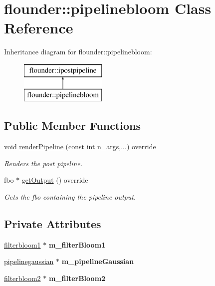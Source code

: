 \hypertarget{classflounder_1_1pipelinebloom}{}\section{flounder\+:\+:pipelinebloom Class Reference}
\label{classflounder_1_1pipelinebloom}
Inheritance diagram for flounder\+:\+:pipelinebloom\+:\begin{figure}[H]
\begin{center}
\leavevmode
\includegraphics[height=2.000000cm]{classflounder_1_1pipelinebloom}
\end{center}
\end{figure}
\subsection*{Public Member Functions}
\begin{DoxyCompactItemize}
\item 
void \hyperlink{classflounder_1_1pipelinebloom_a5f3e5c81ec41947b31f80027911addd0}{render\+Pipeline} (const int n\+\_\+args,...) override
\begin{DoxyCompactList}\small\item\em Renders the post pipeline. \end{DoxyCompactList}\item 
fbo $\ast$ \hyperlink{classflounder_1_1pipelinebloom_a0ab1108f9115014014f7a8bd5ca5ac34}{get\+Output} () override
\begin{DoxyCompactList}\small\item\em Gets the fbo containing the pipeline output. \end{DoxyCompactList}\end{DoxyCompactItemize}
\subsection*{Private Attributes}
\begin{DoxyCompactItemize}
\item 
\mbox{\label{classflounder_1_1pipelinebloom_a13ce8b44898b4c33b8dc18ca3ac35ae1}} 
\hyperlink{classflounder_1_1filterbloom1}{filterbloom1} $\ast$ {\bfseries m\+\_\+filter\+Bloom1}
\item 
\mbox{\label{classflounder_1_1pipelinebloom_a46bfd06f745cf4d67f700c52862226ab}} 
\hyperlink{classflounder_1_1pipelinegaussian}{pipelinegaussian} $\ast$ {\bfseries m\+\_\+pipeline\+Gaussian}
\item 
\mbox{\label{classflounder_1_1pipelinebloom_a3e38975362ed7472544d0bff04260337}} 
\hyperlink{classflounder_1_1filterbloom2}{filterbloom2} $\ast$ {\bfseries m\+\_\+filter\+Bloom2}
\end{DoxyCompactItemize}


